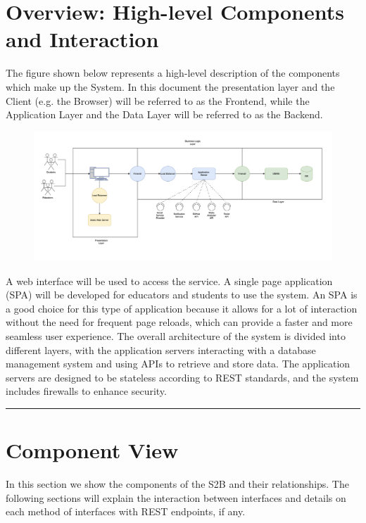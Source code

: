 \documentclass{Configuration_Files/Template}
\begin{document}
\section{Overview: High-level Components and Interaction}

The figure shown below represents a high-level description of the components which make up the System. In this document the presentation layer and the Client (e.g. the Browser) will be referred to as the Frontend, while the Application Layer and the Data Layer will be referred to as the Backend.

\begin{figure}[H]
\centering
\includegraphics[scale = 0.5]{Images/diagrams/overview.png}\\
\end{figure}


A web interface will be used to access the service. A single page application (SPA) will be developed for educators and students to use the system. An SPA is a good choice for this type of application because it allows for a lot of interaction without the need for frequent page reloads, which can provide a faster and more seamless user experience. The overall architecture of the system is divided into different layers, with the application servers interacting with a database management system and using APIs to retrieve and store data. The application servers are designed to be stateless according to REST standards, and the system includes firewalls to enhance security.

{\color{bluepoli}\rule{\linewidth}{0.1pt}}

\section{Component View}

In this section we show the components of the S2B and their relationships. The following sections will explain the interaction between interfaces and details on each method of interfaces with REST endpoints, if any.
\end{document}
